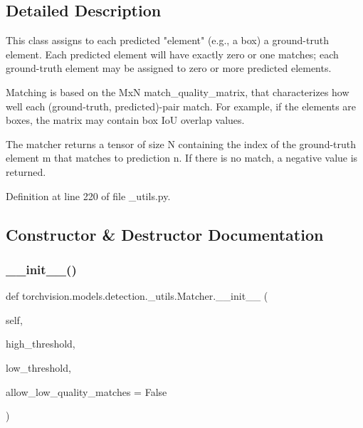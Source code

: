 \subsection{Detailed Description}
\begin{DoxyVerb}This class assigns to each predicted "element" (e.g., a box) a ground-truth
element. Each predicted element will have exactly zero or one matches; each
ground-truth element may be assigned to zero or more predicted elements.

Matching is based on the MxN match_quality_matrix, that characterizes how well
each (ground-truth, predicted)-pair match. For example, if the elements are
boxes, the matrix may contain box IoU overlap values.

The matcher returns a tensor of size N containing the index of the ground-truth
element m that matches to prediction n. If there is no match, a negative value
is returned.
\end{DoxyVerb}
 

Definition at line 220 of file \+\_\+utils.\+py.



\subsection{Constructor \& Destructor Documentation}
\mbox{\label{classtorchvision_1_1models_1_1detection_1_1__utils_1_1Matcher_a6f253e10991f96bdb9dadcb0bdb9ff4d}} 
\subsubsection{\texorpdfstring{\+\_\+\+\_\+init\+\_\+\+\_\+()}{\_\_init\_\_()}}
{\footnotesize\ttfamily def torchvision.\+models.\+detection.\+\_\+utils.\+Matcher.\+\_\+\+\_\+init\+\_\+\+\_\+ (\begin{DoxyParamCaption}\item[{}]{self,  }\item[{}]{high\+\_\+threshold,  }\item[{}]{low\+\_\+threshold,  }\item[{}]{allow\+\_\+low\+\_\+quality\+\_\+matches = {\ttfamily False} }\end{DoxyParamCaption})}

